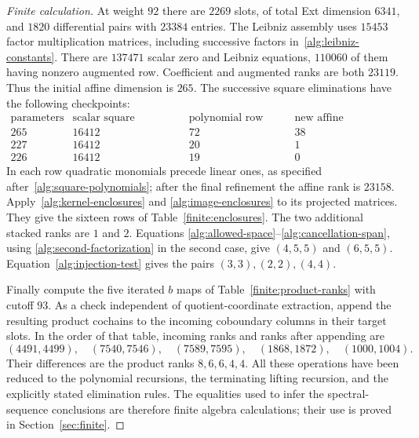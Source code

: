 \documentclass[11pt]{article}
\theoremstyle{definition}
\theoremstyle{remark}
\numberwithin{equation}{section}
\begin{document}
\begin{proof}[Finite calculation]
At weight $92$ there are $2269$ slots, of total Ext dimension $6341$,
and $1820$ differential pairs with $23384$ entries.  The Leibniz
assembly uses $15453$ factor multiplication matrices, including
successive factors in~\eqref{alg:leibniz-constants}.  There are
$137471$ scalar zero and Leibniz equations, $110060$ of them having
nonzero augmented row.  Coefficient and augmented ranks are both
$23119$.  Thus the initial affine dimension is $265$.  The successive
square eliminations have the following checkpoints:
\[
\begin{array}{r|r|r|r}
 \text{parameters}&\text{scalar square equations}&
       \text{polynomial row rank}&\text{new affine restrictions}\\\hline
 265&16412&72&38\\
 227&16412&20&1\\
 226&16412&19&0
\end{array}
\]
In each row quadratic monomials precede linear ones, as specified
after~\eqref{alg:square-polynomials}; after the final refinement the affine
rank is $23158$.  Apply~\eqref{alg:kernel-enclosures} and
\eqref{alg:image-enclosures} to its projected matrices.  They give
the sixteen rows of Table~\ref{finite:enclosures}.  The two additional
stacked ranks are $1$ and $2$.  Equations
\eqref{alg:allowed-space}--\eqref{alg:cancellation-span}, using
\eqref{alg:second-factorization} in the second case, give
$(4,5,5)$ and $(6,5,5)$.  Equation~\eqref{alg:injection-test} gives
the pairs $(3,3),(2,2),(4,4)$.

Finally compute the five iterated $b$ maps of
Table~\ref{finite:product-ranks} with cutoff $93$.  As a check
independent of quotient-coordinate extraction, append the resulting
product cochains to the incoming coboundary columns in their target
slots.  In the order of that table, incoming ranks and ranks after
appending are
\[
 (4491,4499),\quad(7540,7546),\quad(7589,7595),\quad
 (1868,1872),\quad(1000,1004).
\]
Their differences are the product ranks $8,6,6,4,4$.
All these operations have been reduced to the polynomial recursions,
the terminating lifting recursion, and the explicitly stated
elimination rules.  The equalities used to infer the spectral-sequence
conclusions are therefore finite algebra calculations; their use is
proved in Section~\ref{sec:finite}.
\end{proof}
\end{document}

